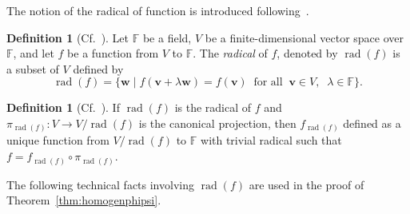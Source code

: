 \documentclass{elsarticle}
\DeclareMathOperator{\rad}{rad}
\def\F{{\mathbb F}}
\theoremstyle{definition}
\newtheorem{definition}[theorem]{Definition}
\numberwithin{equation}{section}
\begin{document}
The notion of the radical of function is introduced following~\cite{Waterhouse1983}.

\begin{definition}[Cf.~{\cite[text at the beginning of Section~1]{Waterhouse1983}}]\label{def:radical}Let $\F$ be a field, $V$ be a finite-dimensional vector space over $\F$, and let $f$ be a function from $V$ to $\F$. The \emph{radical} of $f$, denoted by $\rad (f)$ is a subset of $V$ defined by
\[
\rad (f) = \{\mathbf w \mid f(\mathbf v + \lambda \mathbf w) = f(\mathbf v)\;\;\mbox{for all}\;\; \mathbf v \in V,\;\; \lambda \in \F\}.
\]
\end{definition}

\begin{definition}[Cf.~{\cite[text at the beginning of Section~1]{Waterhouse1983}}]\label{def:radicalfunc}If $\rad(f)$ is the radical of $f$ and $\pi_{\rad(f)}\colon V \to V / \rad(f)$ is the canonical projection, then $f_{\rad(f)}$ defined as a unique function from $V / \rad(f)$  to $\F$ with trivial radical such that $f = f_{\rad(f)}\circ \pi_{\rad(f)}$.
\end{definition}

The following technical facts involving $\rad(f)$ are used in the proof of Theorem~\ref{thm:homogenphipsi}.
\end{document}
